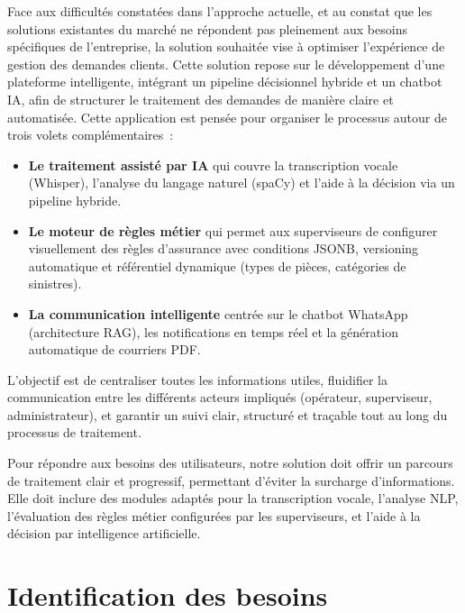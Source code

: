Face aux difficult\'{e}s constat\'{e}es dans l'approche actuelle, et au constat que les solutions existantes du march\'{e} ne r\'{e}pondent pas pleinement aux besoins sp\'{e}cifiques de l'entreprise, la solution souhait\'{e}e vise \`{a} optimiser l'exp\'{e}rience de gestion des demandes clients. Cette solution repose sur le d\'{e}veloppement d'une plateforme intelligente, int\'{e}grant un pipeline d\'{e}cisionnel hybride et un chatbot IA, afin de structurer le traitement des demandes de mani\`{e}re claire et automatis\'{e}e. Cette application est pens\'{e}e pour organiser le processus autour de trois volets compl\'{e}mentaires~:

\begin{itemize}
    \item \textbf{Le traitement assist\'{e} par IA} qui couvre la transcription vocale (Whisper), l'analyse du langage naturel (spaCy) et l'aide \`{a} la d\'{e}cision via un pipeline hybride.
    \item \textbf{Le moteur de r\`{e}gles m\'{e}tier} qui permet aux superviseurs de configurer visuellement des r\`{e}gles d'assurance avec conditions JSONB, versioning automatique et r\'{e}f\'{e}rentiel dynamique (types de pi\`{e}ces, cat\'{e}gories de sinistres).
    \item \textbf{La communication intelligente} centr\'{e}e sur le chatbot WhatsApp (architecture RAG), les notifications en temps r\'{e}el et la g\'{e}n\'{e}ration automatique de courriers PDF.
\end{itemize}

\indent L'objectif est de centraliser toutes les informations utiles, fluidifier la communication entre les diff\'{e}rents acteurs impliqu\'{e}s (op\'{e}rateur, superviseur, administrateur), et garantir un suivi clair, structur\'{e} et tra\c{c}able tout au long du processus de traitement.

\indent Pour r\'{e}pondre aux besoins des utilisateurs, notre solution doit offrir un parcours de traitement clair et progressif, permettant d'\'{e}viter la surcharge d'informations. Elle doit inclure des modules adapt\'{e}s pour la transcription vocale, l'analyse NLP, l'\'{e}valuation des r\`{e}gles m\'{e}tier configur\'{e}es par les superviseurs, et l'aide \`{a} la d\'{e}cision par intelligence artificielle.

\section{Identification des besoins}
\label{sec:identification}

